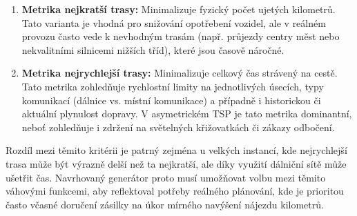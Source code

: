 \begin{enumerate}
    \item \textbf{Metrika nejkratší trasy:} Minimalizuje fyzický počet ujetých kilometrů. Tato varianta je vhodná pro snižování opotřebení vozidel, ale v reálném provozu často vede k nevhodným trasám (např. průjezdy centry měst nebo nekvalitními silnicemi nižších tříd), které jsou časově náročné.
    \item \textbf{Metrika nejrychlejší trasy:} Minimalizuje celkový čas strávený na cestě. Tato metrika zohledňuje rychlostní limity na jednotlivých úsecích, typy komunikací (dálnice vs. místní komunikace) a případně i historickou či aktuální plynulost dopravy. V asymetrickém TSP je tato metrika dominantní, neboť zohledňuje i zdržení na světelných křižovatkách či zákazy odbočení.
\end{enumerate}

Rozdíl mezi těmito kritérii je patrný zejména u velkých instancí, kde nejrychlejší trasa může být výrazně delší než ta nejkratší, ale díky využití dálniční sítě může ušetřit čas. Navrhovaný generátor proto musí umožňovat volbu mezi těmito váhovými funkcemi, aby reflektoval potřeby reálného plánování, kde je prioritou často včasné doručení zásilky na úkor mírného navýšení nájezdu kilometrů.
\endinput